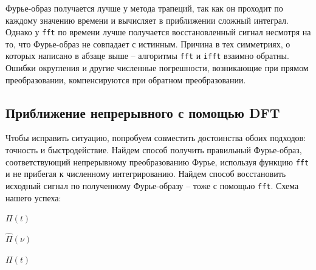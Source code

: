 \documentclass[a4paper, 12pt]{article}
\begin{document}
    Фурье-образ получается лучше у метода трапеций, так как он проходит по каждому значению времени и вычисляет
    в приближении сложный интеграл. Однако у \texttt{fft} по времени лучше получается восстановленный сигнал несмотря на то,
    что Фурье-образ не совпадает с истинным. Причина в тех симметриях, о которых написано в абзаце выше -- алгоритмы
    \texttt{fft} и \texttt{ifft} взаимно обратны. Ошибки округления и другие численные погрешности, возникающие при прямом преобразовании,
    компенсируются при обратном преобразовании.


    \subsection{Приближение непрерывного с помощью DFT}
    Чтобы исправить ситуацию, попробуем совместить достоинства обоих подходов: точность и быстродействие.
    Найдем способ получить правильный Фурье-образ, соответствующий непрерывному преобразованию Фурье, используя функцию \texttt{fft} и не прибегая к численному
    интегрированию. Найдем способ восстановить исходный сигнал по полученному
    Фурье-образу -- тоже с помощью \texttt{fft}. Схема нашего успеха:
    \begin{center}
        $\Pi(t)$
        $\hat{\Pi}(\nu)$
        $\Pi(t)$
    \end{center}
\end{document}

